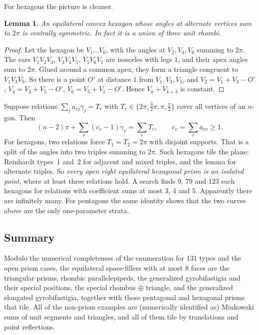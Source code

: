 \documentclass[11pt]{amsart}
\newtheorem{lemma}[thm]{Lemma}
\theoremstyle{definition}
\newcommand{\msum}{\oplus}
\begin{document}
For hexagons the picture is cleaner.

\begin{lemma}
An equilateral convex hexagon whose angles at alternate vertices sum to $2\pi$ is centrally symmetric. In fact it is a
union of three unit rhombi.
\end{lemma}
\begin{proof}
Let the hexagon be $V_1\dots V_6$, with the angles at $V_2,V_4,V_6$ summing to $2\pi$. The ears $V_1V_2V_3$,
$V_3V_4V_5$, $V_5V_6V_1$ are isosceles with legs $1$, and their apex angles sum to $2\pi$. Glued around a common apex,
they form a triangle congruent to $V_1V_3V_5$. So there is a point $O'$ at distance $1$ from $V_1,V_3,V_5$, and
$V_2=V_1+V_3-O'$, $V_4=V_3+V_5-O'$, $V_6=V_5+V_1-O'$. Hence $V_k+V_{k+3}$ is constant.
\end{proof}

Suppose relations $\sum_j a_{rj}\gamma_j=T_r$ with $T_r\in\{2\pi,\frac32\pi,\pi,\frac\pi2\}$ cover all vertices of an
$n$-gon. Then
\[(n-2)\pi+\sum_v(c_v-1)\gamma_v=\sum_r T_r,\qquad c_v=\sum_r a_{rv}\ge1.\]
For hexagons, two relations force $T_1=T_2=2\pi$ with disjoint supports. That is a split of the angles into two
triples summing to $2\pi$. Such hexagons tile the plane: Reinhardt types~1 and~2 for adjacent and mixed triples, and the
lemma for alternate triples. So \emph{every open right equilateral hexagonal prism is an isolated point}, where at least
three relations hold. A search finds $9$, $79$ and $123$ such hexagons for relations with coefficient sums at most $3$,
$4$ and $5$. Apparently there are infinitely many. For pentagons the same identity shows that the two curves above are
the only one-parameter strata.

\subsection{Summary}
Modulo the numerical completeness of the enumeration for $131$ types and the open prism cases, the equilateral
space-fillers with at most $8$ faces are the triangular prisms, rhombic parallelepipeds, the generalized gyrobifastigia
and their special positions, the special rhombus $\msum$ triangle, and the generalized elongated gyrobifastigia,
together with those pentagonal and hexagonal prisms that tile. All of the non-prism examples are (numerically identified as) Minkowski
sums of unit segments and triangles, and all of them tile by translations and point reflections.
\end{document}
